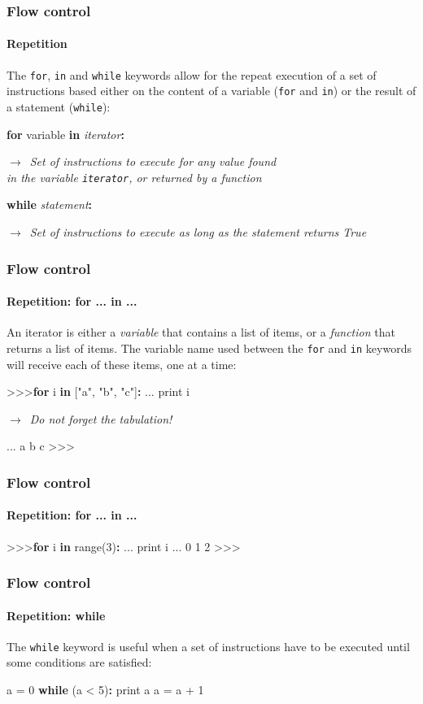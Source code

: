 \documentclass[handout]{beamer}
\def\prompt{>\hspace{-1pt}>\hspace{-1pt}>\/}
\newcommand{\comment}[1]{{\raggedright $\rightarrow$~\textit{\textsf{#1}}}}
\begin{document}
\begin{frame}[fragile]
	\frametitle{Flow control}
	\framesubtitle{Repetition}

	The \texttt{for}, \texttt{in} and \texttt{while} keywords allow for the repeat execution of a set of instructions based either on the content of a variable (\texttt{for} and \texttt{in}) or the result of a statement (\texttt{while}):

	\pause
	\begin{semiverbatim}
		\textbf{for} variable \textbf{in} \textit{iterator}\textbf{:}
		  \comment{Set of instructions to execute for any value found\\ in the variable \texttt{\textit{iterator}}, or returned by a function}

		\pause
		\textbf{while} \textit{statement}\textbf{:}
		  \comment{Set of instructions to execute as long as the statement returns True}
	\end{semiverbatim}
\end{frame}

\begin{frame}[fragile]
	\frametitle{Flow control}
	\framesubtitle{Repetition: for ... in ...}

	An iterator is either a \textit{variable} that contains a list of items, or a \textit{function} that returns a list of items. The variable name used between the \texttt{for} and \texttt{in} keywords will receive each of these items, one at a time:

	\begin{semiverbatim}
		\prompt \textbf{for} i \textbf{in} ["a", "b", "c"]\textbf{:}
		...     print i \comment{Do not forget the tabulation!}
		...
		a
		b
		c
		\prompt
	\end{semiverbatim}
\end{frame}

\begin{frame}[fragile]
	\frametitle{Flow control}
	\framesubtitle{Repetition: for ... in ...}

	\begin{semiverbatim}
		\prompt \textbf{for} i \textbf{in} range(3)\textbf{:}
		...     print i
		...
		0
		1
		2
		\prompt
	\end{semiverbatim}
\end{frame}

\begin{frame}[fragile]
	\frametitle{Flow control}
	\framesubtitle{Repetition: while}

	The \texttt{while} keyword is useful when a set of instructions have to be executed until some conditions are satisfied:

	\begin{semiverbatim}
		a = 0
		\textbf{while} (a < 5)\textbf{:}
		    print a
		    a = a + 1
	\end{semiverbatim}
\end{frame}
\end{document}
